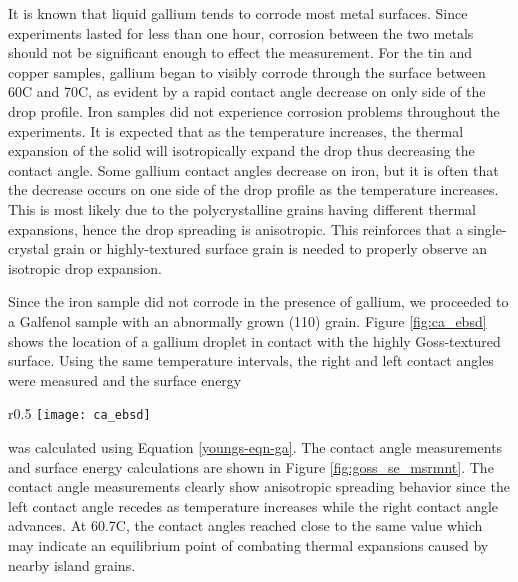 It is known that liquid gallium tends to corrode most metal surfaces.\cite{Lewandowski2015,Narh1998,Fitzgerald1999} Since experiments lasted for less than one hour, corrosion between the two metals should not be significant enough to effect the measurement. For the tin and copper samples, gallium began to visibly corrode through the surface between 60\degree C and 70\degree C, as evident by a rapid contact angle decrease on only side of the drop profile. Iron samples did not experience corrosion problems throughout the experiments. It is expected that as the temperature increases, the thermal expansion of the solid will isotropically expand the drop thus decreasing the contact angle. Some gallium contact angles decrease on iron, but it is often that the decrease occurs on one side of the drop profile as the temperature increases. This is most likely due to the polycrystalline grains having different thermal expansions, hence the drop spreading is anisotropic. This reinforces that a single-crystal grain or highly-textured surface grain is needed to properly observe an isotropic drop expansion. 


Since the iron sample did not corrode in the presence of gallium, we proceeded to a Galfenol sample with an abnormally grown \hkl(110) grain. Figure \ref{fig:ca_ebsd} shows the location of a gallium droplet in contact with the highly Goss-textured surface. Using the same temperature intervals, the right and left contact angles were measured and the surface energy
\begin{wrapfigure}[8]{r}{0.5\linewidth}
	\centering
	\texttt{[image: ca\_ebsd]}
	\caption{The location of a gallium drop on highly Goss-textured surface.}
	\label{fig:ca_ebsd}
\end{wrapfigure}
 was calculated using Equation \ref{youngs-eqn-ga}. The contact angle measurements and surface energy calculations are shown in Figure \ref{fig:goss_se_msrmnt}. The contact angle measurements clearly show anisotropic spreading behavior since the left contact angle recedes as temperature increases while the right contact angle advances. At 60.7\degree C, the contact angles reached close to the same value which may indicate an equilibrium point of combating thermal expansions caused by nearby island grains. 

